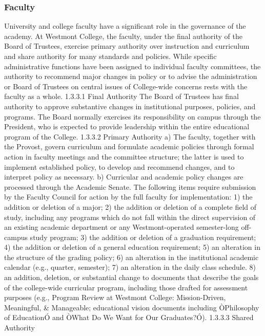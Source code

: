 \documentclass[letterpaper, 11pt]{article}
\begin{document}
		\subsubsection{Faculty}
			University and college faculty have a significant role in the governance of the academy. At Westmont College, the faculty, under the final authority of the Board of Trustees, exercise primary authority over instruction and curriculum and share authority for many standards and policies.  While specific administrative functions have been assigned to individual faculty committees, the authority to recommend major changes in policy or to advise the administration or Board of Trustees on central issues of College-wide concerns rests with the faculty as a whole.
			1.3.3.1 Final Authority
			The Board of Trustees has final authority to approve substantive changes in institutional purposes, policies, and programs.  The Board normally exercises its responsibility on campus through the President, who is expected to provide leadership within the entire educational program of the College.
			1.3.3.2 Primary Authority
			a) The faculty, together with the Provost, govern curriculum and formulate academic policies through formal action in faculty meetings and the committee structure; the latter is used to implement established policy, to develop and recommend changes, and to interpret policy as necessary.
			b) Curricular and academic policy changes are processed through the Academic Senate. The following items require submission by the Faculty Council for action by the full faculty for implementation:
			1) the addition or deletion of a major;
			2) the addition or deletion of a complete field of study, including any programs which do not fall within the direct supervision of an existing academic department or any Westmont-operated semester-long off-campus study program;
			3) the addition or deletion of a graduation requirement;
			4) the addition or deletion of a general education requirement;
			5) an alteration in the structure of the grading policy;
			6) an alteration in the institutional academic calendar (e.g., quarter, semester);
			7) an alteration in the daily class schedule.
			8) an addition, deletion, or substantial change to documents that describe the
			goals of the college-wide curricular program, including those drafted for
			assessment purposes (e.g., Program Review at Westmont College: Mission-Driven,
			Meaningful, \& Manageable; educational vision documents including ÒPhilosophy of EducationÓ and ÒWhat Do We Want for Our Graduates?Ó).
			1.3.3.3 Shared Authority
\end{document}
